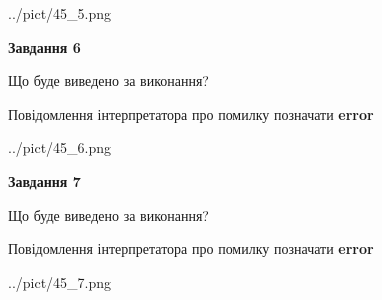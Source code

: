 \documentclass[10pt, ukrainian]{article}
\begin{document}
{\begin {large}
\begin{center}
	{../pict/45_5.png}
\end{center}
\newpage

{\begin {center}\textbf{Завдання 6}\end {center}}\par
Що буде виведено за виконання? \par
Повідомлення інтерпретатора про помилку позначати \textbf{error}

\begin{center}
	{../pict/45_6.png}
\end{center}
\newpage

{\begin {center}\textbf{Завдання 7}\end {center}}\par
Що буде виведено за виконання? \par
Повідомлення інтерпретатора про помилку позначати \textbf{error}

\begin{center}
	{../pict/45_7.png}
\end{center}
\newpage

\end {large}}
\end{document}

